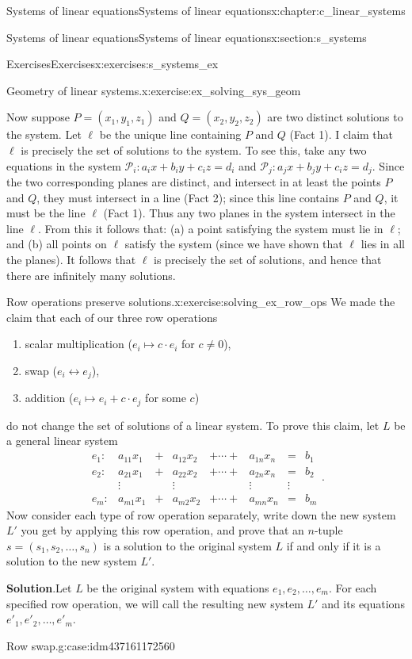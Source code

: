 \documentclass[oneside,10pt,]{book}
\newcommand{\blocktitlefont}{\relax}
\numberwithin{equation}{section}
\newcommand{\numeqsys}{\begin{array}{rrcrcrcr}
e_1:\amp  a_{11}x_{1}\amp +\amp a_{12}x_{2}\amp +\cdots+\amp  a_{1n}x_{n}\amp =\amp b_1\\
e_2: \amp a_{21}x_{1}\amp +\amp a_{22}x_{2}\amp +\cdots+\amp a_{2n}x_{n}\amp =\amp b_2\\
\amp \vdots\amp   \amp \vdots \amp  \amp \vdots \amp  \vdots\\
e_m: \amp a_{m1}x_{1}\amp +\amp a_{m2}x_{2}\amp +\cdots +\amp a_{mn}x_{n}\amp =\amp b_m
\end{array}
}
\newcommand{\amp}{&}
\begin{document}
\begin{chapterptx}{Systems of linear equations}{}{Systems of linear equations}{}{}{x:chapter:c_linear_systems}
\begin{sectionptx}{Systems of linear equations}{}{Systems of linear equations}{}{}{x:section:s_systems}
\begin{exercises-subsection-numberless}{Exercises}{}{Exercises}{}{}{x:exercises:s_systems_ex}
\begin{divisionexercise}{1}{Geometry of linear systems.}{}{x:exercise:ex_solving_sys_geom}
\par
Now suppose \(P=(x_1,y_1,z_1)\) and \(Q=(x_2,y_2,z_2)\) are two distinct solutions to the system. Let \(\ell\) be the unique line containing \(P\) and \(Q\) (Fact 1). I claim that \(\ell\) is precisely the set of solutions to the system. To see this, take any two equations in the system \(\mathcal{P}_i\colon a_ix+b_iy+c_iz=d_i\) and \(\mathcal{P}_j\colon a_jx+b_jy+c_iz=d_j\). Since the two corresponding planes are distinct, and intersect in at least the points \(P\) and \(Q\), they must intersect in a line (Fact 2); since this line contains \(P\) and \(Q\), it must be the line \(\ell\) (Fact 1). Thus any two planes in the system intersect in the line \(\ell\). From this it follows that: (a) a point satisfying the system must lie in \(\ell\); and (b) all points on \(\ell\) satisfy the system (since we have shown that \(\ell\) lies in all the planes). It follows that \(\ell\) is precisely the set of solutions, and hence that there are infinitely many solutions.%
\end{divisionexercise}%
\begin{divisionexercise}{2}{Row operations preserve solutions.}{}{x:exercise:solving_ex_row_ops}%
We made the claim that each of our three row operations%
\begin{enumerate}[marker=(\alph*)]
\item{}scalar multiplication (\(e_i\mapsto c\cdot e_i\) for \(c\ne 0\)),%
\item{}swap (\(e_i\leftrightarrow e_j\)),%
\item{}addition (\(e_i\mapsto e_i+c\cdot e_j\) for some \(c\))%
\end{enumerate}
%
 do not change the set of solutions of a linear system. To prove this claim, let \(L\) be a general linear system%
\begin{equation*}
\numeqsys\text{.}
\end{equation*}
Now consider each type of row operation separately, write down the new system \(L'\) you get by applying this row operation, and prove that an \(n\)-tuple \(s=(s_1,s_2,\dots ,s_n)\) is a solution to the original system \(L\) if and only if it is a solution to the new system \(L'\).\par\smallskip%
\noindent\textbf{\blocktitlefont Solution}.\hypertarget{g:solution:idm437161183152}{}\quad{}Let \(L\) be the original system with equations \(e_1,e_2,\dots ,e_m\). For each specified row operation, we will call the resulting new system \(L'\) and its equations \(e'_1,e'_2,\dots , e'_m\).%
\begin{case}{}{Row swap.}{g:case:idm437161172560}

\end{case}
\end{divisionexercise}
\end{exercises-subsection-numberless}
\end{sectionptx}
\end{chapterptx}
\end{document}
